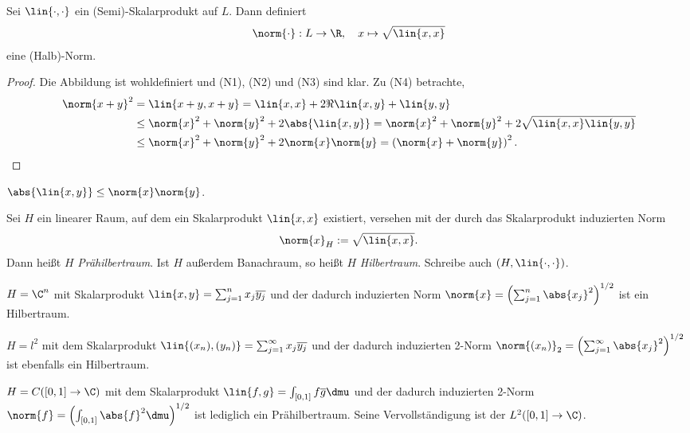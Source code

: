 \begin{prop}
\label{prop:5.3}
Sei $\lin{\cdot,\cdot}$ ein (Semi)-Skalarprodukt auf $L$. Dann definiert
\begin{align*}
\norm{\cdot}: L\to \R,\quad x\mapsto \sqrt{\lin{x,x}}
\end{align*}
eine (Halb)-Norm.\fishhere
\end{prop}
\begin{proof}
Die Abbildung ist wohldefiniert und (N1), (N2) und (N3) sind klar. Zu (N4)
betrachte,
\begin{align*}
\norm{x+y}^2  &=\lin{x+y,x+y} = \lin{x,x} + 2\Re \lin{x,y} + \lin{y,y}\\
&\le \norm{x}^2 + \norm{y}^2 + 2\abs{\lin{x,y}}
=  \norm{x}^2 + \norm{y}^2 + 2\sqrt{\lin{x,x}\lin{y,y}}\\
&\le \norm{x}^2 + \norm{y}^2 + 2\norm{x}\norm{y}
= \left(\norm{x}+\norm{y}\right)^2.\qedhere
\end{align*}
\end{proof}

\begin{bem}
\label{bem:5.4}
$\abs{\lin{x,y}}\le \norm{x}\norm{y}$.\maphere
\end{bem}

\begin{defn}
\label{defn:5.5}
Sei $H$ ein linearer Raum, auf dem ein Skalarprodukt $\lin{x,x}$
existiert, versehen mit der durch das Skalarprodukt induzierten Norm
\begin{align*}
\norm{x}_H := \sqrt{\lin{x,x}}. 
\end{align*}
Dann heißt $H$ \emph{Prähilbertraum}. Ist $H$ außerdem
Banachraum, so heißt $H$ \emph{Hilbertraum}. Schreibe auch
$(H,\lin{\cdot,\cdot})$.\fishhere
\end{defn}

\begin{bsp}
\label{bsp:5.6}
\begin{bspenum}
  \item $H=\C^n$ mit Skalarprodukt $\lin{x,y}=\sum_{j=1}^n
  x_j\overline{y_j}$ und der dadurch induzierten Norm $\norm{x}=
  \left(\sum_{j=1}^n \abs{x_j}^2\right)^{1/2}$ ist ein Hilbertraum.
  \item $H = l^2$ mit dem Skalarprodukt $\lin{(x_n),(y_n)} =
  \sum_{j=1}^\infty x_j \overline{y_j}$ und der dadurch induzierten
  2-Norm $\norm{(x_n)}_2 = \left(\sum_{j=1}^\infty
  \abs{x_j}^2\right)^{1/2}$ ist ebenfalls ein Hilbertraum.
  \item $H=C([0,1]\to\C)$ mit dem Skalarprodukt $\lin{f,g} = \int_{[0,1]}
  f\overline{g}\dmu$ und der dadurch induzierten 2-Norm
  $\norm{f} = \left(\int_{[0,1]} \abs{f}^2 \dmu\right)^{1/2}$ ist lediglich
  ein Prähilbertraum. Seine Vervollständigung ist der $L^2([0,1]\to\C)$.\bsphere
\end{bspenum}
\end{bsp}

